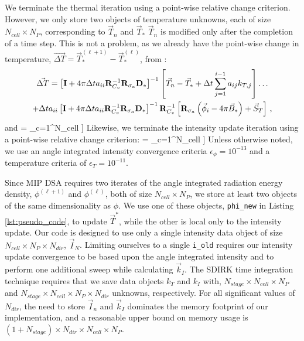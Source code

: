 We terminate the thermal iteration using a point-wise relative change criterion. 
However, we only store two objects of temperature unknowns, each of size $N_{cell} \times N_P$, corresponding to $\vec{T}_n$ and $\vec{T}_*$
$\vec{T}_n$ is modified only after the completion of a time step.  
This is not a problem, as we already have the point-wise change in temperature, $\vec{\Delta T} = \vec{T}_*^{(\ell+1)} - \vec{T}_*^{(\ell)}$, from :
\begin{multline}
\vec{\Delta T} = \left[ \mathbf{I} + 4\pi\Delta t a_{ii}\mathbf{R}_{C_v}^{-1}\mathbf{R}_{\sigma_a} \mathbf{D}_*   \right]^{-1}\left[\vec{T}_n -\vec{T}_* + \Delta t \sum_{j=1}^{i-1}{a_{ij} k_{T,j}   }\right] \dots \\
+ \Delta t a_{ii}\left[ \mathbf{I}  + 4\pi\Delta t a_{ii}\mathbf{R}_{C_v}^{-1}\mathbf{R}_{\sigma_a} \mathbf{D}_*   \right]^{-1}\mathbf{R}_{C_v}^{-1}
\left[ \mathbf{R}_{\sigma_a}\left(\vec{\phi}_i - 4\pi\vec{B}_*  \right) + \vec{S}_T \right] \, ,
\end{multline}
and
\benum
{} = \max_{c=1}^{N_{cell}} \left[ \max_{j=1}^{N_P} \left[  \abs{ \frac{ \Delta T_j }{ T_{j,*} } } \right] \right] \pep
\eenum
Likewise, we terminate the intensity update iteration using a point-wise relative change criterion:
\benum
{} = \max_{c=1}^{N_{cell}} \left[ \max_{j=1}^{N_P} \left[ { \abs{ \frac{ \phi^{(\ell+1)}_{c,j} - \phi^{(\ell)}_{c,j}}{\phi^{(\ell+1)}_{c,j} }} } \right] \right] \pep
\label{eq:change_phi}
\eenum
Unless otherwise noted, we use an angle integrated intensity convergence criteria $\epsilon_{\phi} = 10^{-13}$ and a temperature criteria of $\epsilon_{T} = 10^{-11}$.

Since MIP DSA requires two iterates of the angle integrated radiation energy density, $\phi^{(\ell+1)}$ and $\phi^{(\ell)}$, both of size $N_{cell} \times N_P$, we store at least two objects of the same dimensionality as $\phi$.
We use one of these objects, \verb+phi_new+ in Listing \ref{lst:pseudo_code}, to update $\vec{T}^*$, while the other is local only to the intensity update.
Our code is designed to use only a single intensity data object of size $N_{cell} \times N_P \times N_{dir}$, $\vec{I}_N$.
Limiting ourselves to a single \verb+i_old+ requires our intensity update convergence to be based upon the angle integrated intensity and to perform one additional sweep while calculating $\vec{k}_I$.
The SDIRK time integration technique requires that we save data objects $k_T$ and $k_I$ with,  $N_{stage} \times N_{cell} \times N_P$ and $N_{stage} \times N_{cell} \times N_P \times N_{dir}$ unknowns, respectively.
For all significant values of $N_{dir}$, the need to store $\vec{I}_n$ and $\vec{k}_I$ dominates the memory footprint of our implementation, and a reasonable upper bound on memory usage is $(1+N_{stage}) \times N_{dir} \times N_{cell} \times N_P$.

